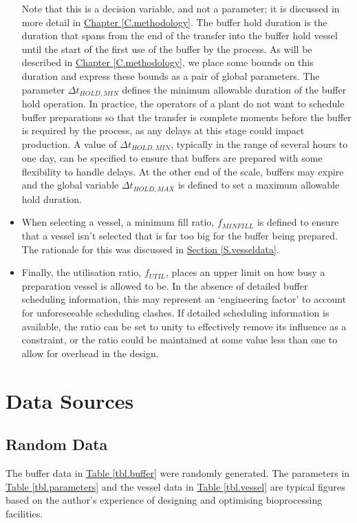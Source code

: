 \begin{itemize}
Note that this is a decision variable, and not a parameter; it is discussed in
more detail in \hyperref[C.methodology]{Chapter \ref*{C.methodology}}.
The buffer hold duration is the duration that spans from the end of the
transfer into the buffer hold vessel until the start of the first use of the
buffer by the process.
As will be described in 
\hyperref[C.methodology]{Chapter \ref*{C.methodology}},
we place some bounds on this duration and express these bounds as a pair of
global parameters.
The parameter $\Delta t_{\mathit{HOLD,MIN}}$ defines the minimum allowable
duration of the buffer hold operation.
In practice, the operators of a plant do not want to schedule buffer
preparations so that the transfer is complete moments before the buffer is
required by the process, as any delays at this stage could impact production.
A value of $\Delta t_{\mathit{HOLD,MIN}}$, typically in the range of several
hours to one day, can be specified to ensure that buffers are prepared with
some flexibility to handle delays.
At the other end of the scale, buffers may expire and the global variable 
$\Delta t_{\mathit{HOLD,MAX}}$ is defined to set a maximum allowable hold
duration.
\item
When selecting a vessel, a minimum fill ratio, $f_{\mathit{MINFILL}}$ is
defined to ensure that a vessel isn't selected that is far too big for the
buffer being prepared. The rationale for this was discussed in
\hyperref[S.vesseldata]{Section \ref*{S.vesseldata}}.
\item
Finally, the utilisation ratio, $f_{\mathit{UTIL}}$, places an upper limit on
how busy a preparation vessel is allowed to be.
In the absence of detailed buffer scheduling information, this may represent an
`engineering factor' to account for unforeseeable scheduling clashes.
If detailed scheduling information is available, the ratio can be set to unity
to effectively remove its influence as a constraint, or the ratio could be
maintained at some value less than one to allow for overhead in the design.
\end{itemize}

\section{Data Sources}\label{S.sources}

\subsection{Random Data}\label{SS.randomdata}
The buffer data in \hyperref[tbl.buffer]{Table \ref*{tbl.buffer}} were randomly
generated.  
The parameters in \hyperref[tbl.parameters]{Table \ref*{tbl.parameters}} and
the vessel data in \hyperref[tbl.vessel]{Table \ref*{tbl.vessel}} are typical
figures based on the author's experience of designing and optimising
bioprocessing facilities.

